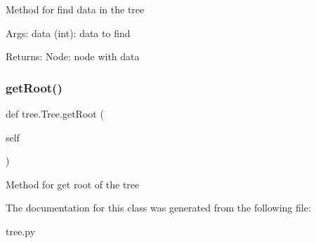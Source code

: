\begin{DoxyVerb}Method for find data in the tree

Args:
    data (int): data to find

Returns:
    Node: node with data
\end{DoxyVerb}
 \mbox{\label{classtree_1_1Tree_aeafbc59fabeae3758a3298f167bdf5af}} 
\subsubsection{\texorpdfstring{get\+Root()}{getRoot()}}
{\footnotesize\ttfamily def tree.\+Tree.\+get\+Root (\begin{DoxyParamCaption}\item[{}]{self }\end{DoxyParamCaption})}

\begin{DoxyVerb}Method for get root of the tree \end{DoxyVerb}
 

The documentation for this class was generated from the following file\+:\begin{DoxyCompactItemize}
\item 
tree.\+py\end{DoxyCompactItemize}
